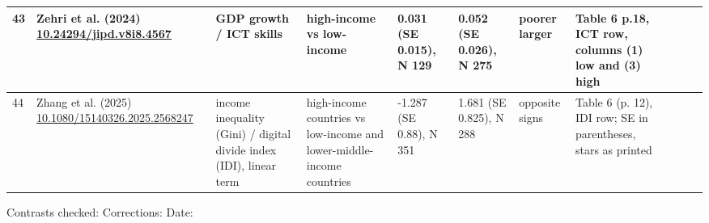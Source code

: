 \documentclass[10pt,a4paper]{article}
\begin{document}
\begin{longtable}{@{}p{0.4cm}p{2.4cm}p{2.6cm}p{3.0cm}p{2.6cm}p{2.6cm}p{1.5cm}p{5.6cm}p{0.3cm}p{1.0cm}p{1.6cm}@{}}
43 & Zehri et al. (2024) \newline \url{10.24294/jipd.v8i8.4567} & GDP growth / ICT skills & high-income vs low-income & 0.031 (SE 0.015), N 129 & 0.052 (SE 0.026), N 275 & poorer larger & Table 6 p.18, ICT row, columns (1) low and (3) high &  &  &  \\ \midrule
44 & Zhang et al. (2025) \newline \url{10.1080/15140326.2025.2568247} & income inequality (Gini) / digital divide index (IDI), linear term & high-income countries vs low-income and lower-middle-income countries & -1.287 (SE 0.88), N 351 & 1.681 (SE 0.825), N 288 & opposite signs & Table 6 (p. 12), IDI row; SE in parentheses, stars as printed &  &  &  \\ \midrule
\end{longtable}
\par\medskip\normalsize Contrasts checked: \underline{\hspace{2cm}} \quad Corrections: \underline{\hspace{2cm}} \quad Date: \underline{\hspace{3cm}}
\end{document}
